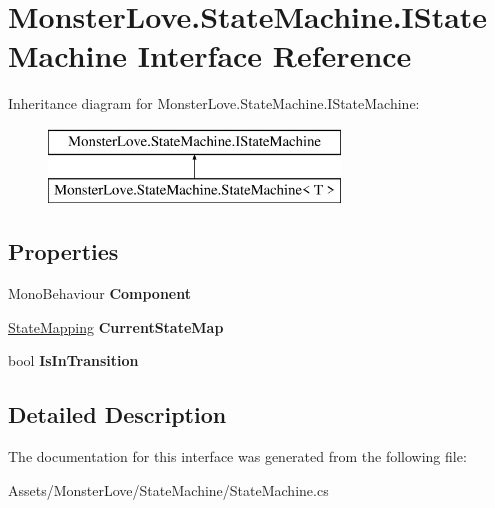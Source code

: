 \hypertarget{interface_monster_love_1_1_state_machine_1_1_i_state_machine}{}\section{Monster\+Love.\+State\+Machine.\+I\+State\+Machine Interface Reference}
\label{interface_monster_love_1_1_state_machine_1_1_i_state_machine}


 


Inheritance diagram for Monster\+Love.\+State\+Machine.\+I\+State\+Machine\+:\begin{figure}[H]
\begin{center}
\leavevmode
\includegraphics[height=2.000000cm]{interface_monster_love_1_1_state_machine_1_1_i_state_machine}
\end{center}
\end{figure}
\subsection*{Properties}
\begin{DoxyCompactItemize}
\item 
Mono\+Behaviour {\bfseries Component}\hypertarget{interface_monster_love_1_1_state_machine_1_1_i_state_machine_aa699aef47a8b037d556c1657b0e3ae16}{}\label{interface_monster_love_1_1_state_machine_1_1_i_state_machine_aa699aef47a8b037d556c1657b0e3ae16}

\item 
\hyperlink{class_monster_love_1_1_state_machine_1_1_state_mapping}{State\+Mapping} {\bfseries Current\+State\+Map}\hypertarget{interface_monster_love_1_1_state_machine_1_1_i_state_machine_a256a3f6bf52ab415282aa5ae8a0cf59f}{}\label{interface_monster_love_1_1_state_machine_1_1_i_state_machine_a256a3f6bf52ab415282aa5ae8a0cf59f}

\item 
bool {\bfseries Is\+In\+Transition}\hypertarget{interface_monster_love_1_1_state_machine_1_1_i_state_machine_abe11256d7a5b77a6e5a009dbbdf6dca9}{}\label{interface_monster_love_1_1_state_machine_1_1_i_state_machine_abe11256d7a5b77a6e5a009dbbdf6dca9}

\end{DoxyCompactItemize}


\subsection{Detailed Description}




The documentation for this interface was generated from the following file\+:\begin{DoxyCompactItemize}
\item 
Assets/\+Monster\+Love/\+State\+Machine/State\+Machine.\+cs\end{DoxyCompactItemize}
